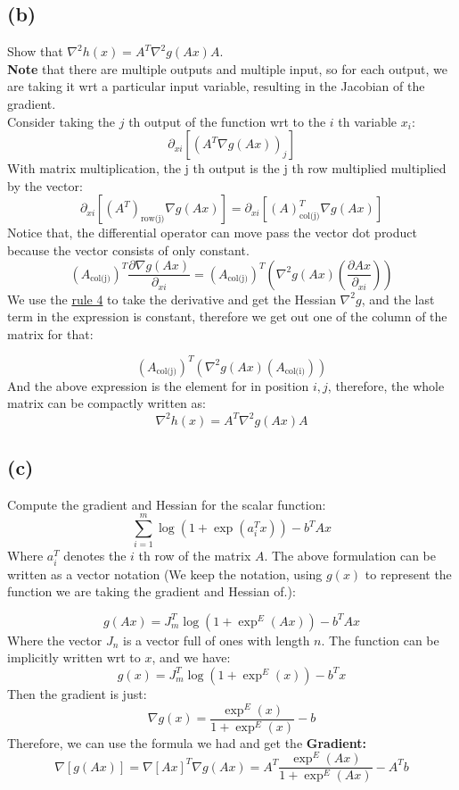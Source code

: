 \documentclass[]{article}
\begin{document}
\subsection*{(b)}
    Show that $\nabla^2h(x) = A^T\nabla^2g(Ax)A$. \\
    \textbf{Note} that there are multiple outputs and multiple input, so for each output, we are taking it wrt a particular input variable, resulting in the Jacobian of the gradient.
    \\
    Consider taking the $j$ th output of the function wrt to the $i$ th variable $x_i$:
    $$
    \partial_{xi} \left[(A^T\nabla g(Ax))_j\right]
    $$
    With matrix multiplication, the j th output is the j th row multiplied multiplied by the vector: 
    $$
    \partial_{xi}\left[
        (A^T)_{\text{row(j)}} \nabla g(Ax)
    \right] =
    \partial_{xi}\left[
        (A)_{\text{col(j)}}^T \nabla g(Ax)
    \right]
    $$
    Notice that, the differential operator can move pass the vector dot product because the vector consists of only constant.
    $$
        (A_{\text{col(j)}})^T
        \frac{\partial \nabla g(Ax)}
        {\partial_{xi}}
        =
        (A_{\text{col(j)}})^T
        \left(
            \nabla^2g(Ax)
            \left(
                \frac{\partial Ax}{\partial_{xi}}
            \right)
        \right)
    $$
    We use the \hyperref[itm:rule4]{rule 4} to take the derivative and get the Hessian $\nabla^2 g$, and the last term in the expression is constant, therefore we get out one of the column of the matrix for that:

    $$
    (A_{\text{col(j)}})^T
        \left(
            \nabla^2g(Ax)
            \left(
                A_{\text{col(i)}}
            \right)
        \right)
    $$
    And the above expression is the element for in position $i, j$, therefore, the whole matrix can be compactly written as:
    $$
    \nabla^2h(x) = A^T\nabla^2g(Ax)A
    $$

\subsection*{(c)}
    Compute the gradient and Hessian for the scalar function:
    $$
    \sum_{i = 1}^m \log(1 + \exp(a^T_ix)) - b^TAx
    $$
    Where $a^T_i$ denotes the $i$ th row  of the matrix $A$.
    The above formulation can be written as a vector notation (We keep the notation, using $g(x)$ to represent the function we are taking the gradient and Hessian of.):

    $$
    g(Ax) = J_m^T \log(1 + \exp^E(Ax)) - b^T Ax
    $$
    Where the vector $J_n$ is a vector full of ones with length $n$.
    The function can be implicitly written wrt to $x$, and we have:
    $$
    g(x) = J_m^T \log(1 + \exp^E(x)) - b^T x
    $$
    Then the gradient is just:
    $$
    \nabla g(x) =  \frac{
    \exp^E(x)
        }{
        1 + \exp^E(x)
        } - b
    $$
    Therefore, we can use the formula we had and get the \textbf{Gradient: }
    $$
    \nabla [g(Ax)] = \nabla[Ax]^T \nabla g(Ax) = A^T
    \frac{
    \exp^E(Ax)
        }{
        1 + \exp^E(Ax)
        } - A^Tb
    $$
\end{document}
